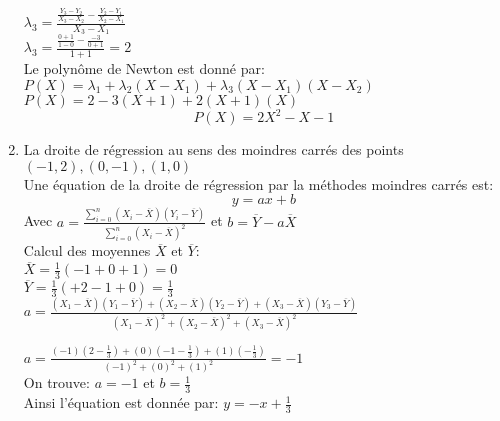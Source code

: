 \documentclass[a4paper,12pt]{article}
\begin{document}
\begin{enumerate}
$\lambda_{3}=\frac{\frac{Y_{3}-Y_{2}}{X_{3}-X_{2}}-\frac{Y_{2}-Y_{1}}{X_{2}-X_{1}}}{X_{3}-X_{1}}$\\

$\lambda_{3}=\frac{\frac{0+1}{1-0}-\frac{-3}{0+1}}{1+1}=2$\\ 

Le polynôme de Newton est donné par: \\
$P(X)=\lambda_{1}+\lambda_{2}(X-X_{1})+\lambda_{3}(X-X_{1})(X-X_{2})$
$P(X)=2-3(X+1)+2(X+1)(X)$ \\ 
\[\boxed{P(X)=2X^{2}-X-1}\]
\item La droite de régression au sens des moindres carrés des points $(-1,2), (0,-1),(1,0)$\\

Une équation de la droite de régression par la méthodes moindres carrés est: \[y=ax+b\] Avec $a=\frac{\displaystyle\sum_{i=0}^n (X_{i}-\overline{X})(Y_{i}-\overline{Y})}{\displaystyle\sum_{i=0}^n (X_{i}-\overline{X})^{2}}$ et $b=\overline{Y}-a\overline{X}$\\

Calcul des moyennes $\overline{X}$ et $\overline{Y}$:\\

$\overline{X}=\frac{1}{3}(-1+0+1)=0$\\$\overline{Y}=\frac{1}{3}(+2-1+0)=\frac{1}{3}$\\

$a=\frac{(X_{1}-\overline{X})(Y_{1}-\overline{Y})+(X_{2}-\overline{X})(Y_{2}-\overline{Y})+(X_{3}-\overline{X})(Y_{3}-\overline{Y})}{(X_{1}-\overline{X})^{2}+(X_{2}-\overline{X})^{2}+(X_{3}-\overline{X})^{2}}$

$a=\frac{(-1)(2-\frac{1}{3})+(0)(-1-\frac{1}{3})+(1)(-\frac{1}{3})}{(-1)^{2}+(0)^{2}+(1)^{2}}=-1$ \\
On trouve:
$\boxed{a=-1}$ et $\boxed{b=\frac{1}{3}}$ \\ Ainsi l'équation est donnée par: $\boxed{y=-x+\frac{1}{3}}$

\end{enumerate}
\end{document}
